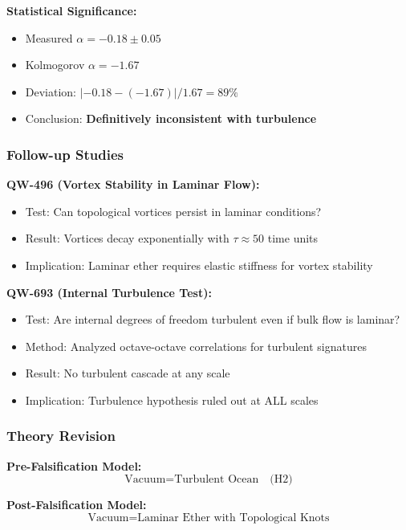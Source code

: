 \documentclass[11pt, a4paper]{article}
\theoremstyle{remark}
\begin{document}
\textbf{Statistical Significance:}
\begin{itemize}
    \item Measured $\alpha = -0.18 \pm 0.05$
    \item Kolmogorov $\alpha = -1.67$
    \item Deviation: $|-0.18 - (-1.67)|/1.67 = 89\%$
    \item Conclusion: \textbf{Definitively inconsistent with turbulence}
\end{itemize}

\subsubsection{Follow-up Studies}

\textbf{QW-496 (Vortex Stability in Laminar Flow):}
\begin{itemize}
    \item Test: Can topological vortices persist in laminar conditions?
    \item Result: Vortices decay exponentially with $\tau \approx 50$ time units
    \item Implication: Laminar ether requires elastic stiffness for vortex stability
\end{itemize}

\textbf{QW-693 (Internal Turbulence Test):}
\begin{itemize}
    \item Test: Are internal degrees of freedom turbulent even if bulk flow is laminar?
    \item Method: Analyzed octave-octave correlations for turbulent signatures
    \item Result: No turbulent cascade at any scale
    \item Implication: Turbulence hypothesis ruled out at ALL scales
\end{itemize}

\subsubsection{Theory Revision}

\textbf{Pre-Falsification Model:}
\begin{equation}
\text{Vacuum} = \text{Turbulent Ocean} \quad \text{(H2)}
\end{equation}

\textbf{Post-Falsification Model:}
\begin{equation}
\text{Vacuum} = \text{Laminar Ether with Topological Knots}
\end{equation}
\end{document}
